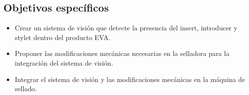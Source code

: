 \subsection{Objetivos espec\'ificos}

\begin{itemize}

    \item Crear un sistema de visi\'on que detecte la presencia del insert, introducer
    y stylet dentro del producto EVA.
    
    
    \item Proponer las modificaciones mec\'anicas necesarias en la selladora para
    la integraci\'on del sistema de visi\'on.
    
    
    \item Integrar el sistema de visi\'on y las modificaciones mec\'anicas en la
    m\'aquina de sellado.
    

\end{itemize}